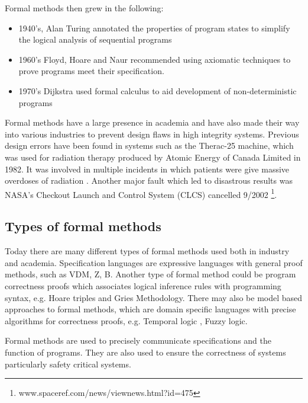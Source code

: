 Formal methods then grew in the following:

\begin{itemize}
\item 1940's, Alan Turing annotated the properties of program states to simplify
the logical analysis of sequential programs

\item 1960's Floyd, Hoare and Naur recommended using axiomatic techniques to
prove programs meet their specification.

\item 1970's Dijkstra used formal calculus to aid development of
non-deterministic programs
\end{itemize}

 Formal methods have a large presence in academia and have also made
their way into various industries to prevent design flaws in high integrity
systems. Previous design errors have been found in systems such as the Therac-25
machine, which was used for radiation therapy produced by Atomic Energy of
Canada Limited in 1982. It was involved in multiple incidents in which patients
were give massive overdoses of radiation \cite{baase2003gift}. Another major
fault which led to disastrous results was NASA’s Checkout Launch and Control
System (CLCS) cancelled 9/2002
\footnote{www.spaceref.com/news/viewnews.html?id=475}.

\subsection{Types of formal methods}


Today there are many different types of formal methods used both in industry and
academia. Specification languages are expressive languages with general proof
methods, such as VDM, Z, B. Another type of formal method could be program
correctness proofs which associates logical inference rules with programming
syntax, e.g. Hoare triples and Gries Methodology. There may also be model based
approaches to formal methods, which are domain specific languages with precise
algorithms for correctness proofs, e.g. Temporal logic \cite{uwa}, Fuzzy logic.

Formal methods are used to precisely communicate specifications and the function
of programs. They are also used to ensure the correctness of systems
particularly safety critical systems.

